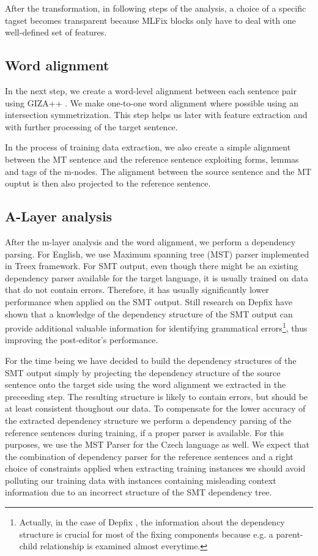 After the transformation, in following steps of the analysis, a choice
of a specific tagset becomes transparent because MLFix blocks only
have to deal with one well-defined set of features.

\subsection{Word alignment}

In the next step, we create a word-level alignment between each sentence pair
using GIZA++ \citep{och:ney:2000}. We make one-to-one word alignment where possible
using an intersection symmetrization. This step helps us later with feature extraction
and with further processing of the target sentence.

In the process of training data extraction, we also create a simple alignment between
the MT sentence and the reference sentence exploiting forms, lemmas and tags
of the m-nodes. The alignment between the source sentence and the MT ouptut is then also
projected to the reference sentence.

\subsection{A-Layer analysis}

After the m-layer analysis and the word alignment, we perform a dependency parsing.
For English, we use Maximum spanning tree (MST) parser \citep{mcdonald:pereira:ribarov:hajic:2005}
implemented in Treex framework. For SMT output, even though there might
be an existing dependency parser available for the target language, it is usually
trained on data that do not contain errors. Therefore, it has usually significantly
lower performance when applied on the SMT output. Still research on Depfix have shown
that a knowledge of the dependency structure of the SMT output can provide additional
valuable information for identifying grammatical errors\footnote{Actually, in the case of Depfix
, the information about the dependency structure is crucial for most of the fixing components
because e.g. a parent-child relationship is examined almost everytime.}, thus improving
the post-editor's performance.

For the time being we have decided to build the dependency structures of the SMT output simply
by projecting the dependency structure of the source sentence onto the target side
using the word alignment we extracted in the preceeding step. The resulting structure
is likely to contain errors, but should be at least consistent thoughout our data.
To compensate for the lower accuracy of the extracted dependency structure we perform
a dependency parsing of the reference sentences during training, if a proper parser
is available. For this purposes, we use the MST Parser for the Czech language as well.
We expect that the combination of dependency parser for the reference sentences and
a right choice of constraints applied when extracting training instances we should
avoid polluting our training data with instances containing misleading context information
due to an incorrect structure of the SMT dependency tree.

